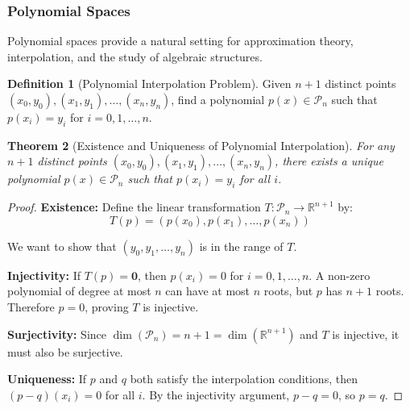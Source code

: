 \documentclass[12pt]{article}
\numberwithin{equation}{section}
\newcommand{\vect}[1]{\boldsymbol{#1}}   %
\theoremstyle{plain}
\newtheorem{theorem}{Theorem}[section]
\theoremstyle{definition}
\newtheorem{definition}[theorem]{Definition}
\theoremstyle{remark}
\begin{document}
\subsubsection{Polynomial Spaces}

Polynomial spaces provide a natural setting for approximation theory, interpolation, and the study of algebraic structures.

\begin{definition}[Polynomial Interpolation Problem]
Given $n+1$ distinct points $(x_0, y_0), (x_1, y_1), \ldots, (x_n, y_n)$, find a polynomial $p(x) \in \mathcal{P}_n$ such that $p(x_i) = y_i$ for $i = 0, 1, \ldots, n$.
\end{definition}

\begin{theorem}[Existence and Uniqueness of Polynomial Interpolation]
For any $n+1$ distinct points $(x_0, y_0), (x_1, y_1), \ldots, (x_n, y_n)$, there exists a unique polynomial $p(x) \in \mathcal{P}_n$ such that $p(x_i) = y_i$ for all $i$.
\end{theorem}

\begin{proof}
\textbf{Existence:} Define the linear transformation $T: \mathcal{P}_n \to \mathbb{R}^{n+1}$ by:
$$T(p) = (p(x_0), p(x_1), \ldots, p(x_n))$$

We want to show that $(y_0, y_1, \ldots, y_n)$ is in the range of $T$.

\textbf{Injectivity:} If $T(p) = \vect{0}$, then $p(x_i) = 0$ for $i = 0, 1, \ldots, n$. A non-zero polynomial of degree at most $n$ can have at most $n$ roots, but $p$ has $n+1$ roots. Therefore $p = 0$, proving $T$ is injective.

\textbf{Surjectivity:} Since $\dim(\mathcal{P}_n) = n+1 = \dim(\mathbb{R}^{n+1})$ and $T$ is injective, it must also be surjective.

\textbf{Uniqueness:} If $p$ and $q$ both satisfy the interpolation conditions, then $(p-q)(x_i) = 0$ for all $i$. By the injectivity argument, $p - q = 0$, so $p = q$.
\end{proof}
\end{document}
